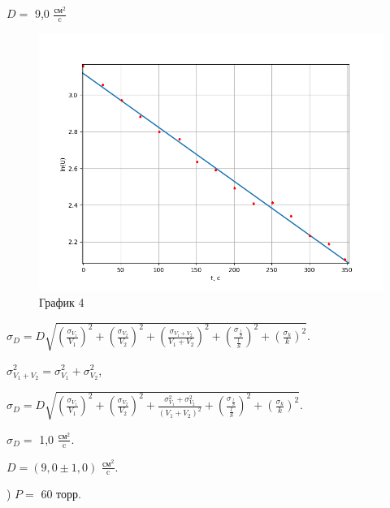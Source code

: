 \documentclass[a4paper,12pt]{article} %
\begin{document}
\begin{enumerate}
$D = $ 9,0 $\frac{\text{см}^2}{\text{c}}$
\newpage
\begin{figure}[h!]
	\centering
	\includegraphics[scale=0.8]{График1(лин).png}
	\caption*{График 4}
\end{figure}


$\sigma_{D} = D\sqrt{\left(\frac{\sigma_{V_{1}}}{V_{1}}\right)^2 + \left(\frac{\sigma_{V_{2}}}{V_{2}}\right)^2 + \left(\frac{\sigma_{V_{1} + V_{2}}}{V_{1}+V_{2}}\right)^2 + \left(\frac{\sigma_{\frac{l}{S}}}{\frac{l}{S}}\right)^2 + \left(\frac{\sigma_{k}}{k}\right)^2}$.

$\sigma_{V_{1} + V_{2}}^2 = \sigma_{V_{1}}^2 + \sigma_{V_{2}}^2$,

$\sigma_{D} = D\sqrt{\left(\frac{\sigma_{V_{1}}}{V_{1}}\right)^2 + \left(\frac{\sigma_{V_{2}}}{V_{2}}\right)^2 + \frac{\sigma_{V_{1}}^2 + \sigma_{V_{2}}^2}{(V_{1} + V_{2})^2} + \left(\frac{\sigma_{\frac{l}{S}}}{\frac{l}{S}}\right)^2 + \left(\frac{\sigma_{k}}{k}\right)^2}$.

$\sigma_{D} = $ 1,0 $\frac{\text{см}^2}{\text{c}}$.
\vspace{15mm}

$D = (9,0 \pm 1,0)$ $\frac{\text{см}^2}{\text{c}}$.

) $P = $ 60 торр.


\end{enumerate}
\end{document}
